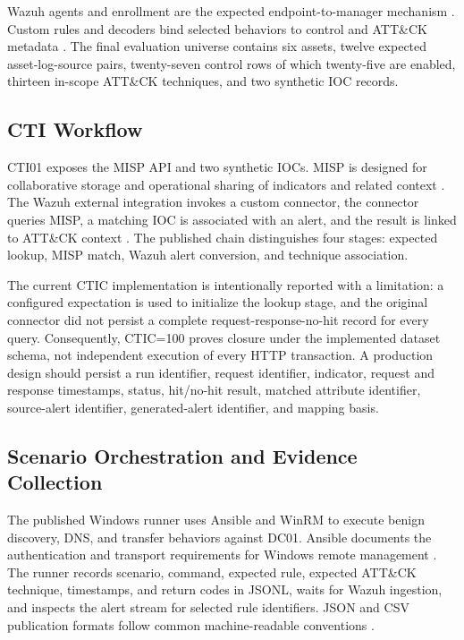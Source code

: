 \documentclass[a4paper,conference]{IEEEtran}
\begin{document}
Wazuh agents and enrollment are the expected endpoint-to-manager mechanism \cite{wazuh_agent_install,wazuh_enrollment}. Custom rules and decoders bind selected behaviors to control and ATT\&CK metadata \cite{wazuh_customrules,wazuh_mitre}. The final evaluation universe contains six assets, twelve expected asset-log-source pairs, twenty-seven control rows of which twenty-five are enabled, thirteen in-scope ATT\&CK techniques, and two synthetic IOC records.

\subsection{CTI Workflow}
CTI01 exposes the MISP API and two synthetic IOCs. MISP is designed for collaborative storage and operational sharing of indicators and related context \cite{wagner2016,misp_docs,misp_install}. The Wazuh external integration invokes a custom connector, the connector queries MISP, a matching IOC is associated with an alert, and the result is linked to ATT\&CK context \cite{wazuh_integrator,oasis_stix,oasis_taxii}. The published chain distinguishes four stages: expected lookup, MISP match, Wazuh alert conversion, and technique association.

The current CTIC implementation is intentionally reported with a limitation: a configured expectation is used to initialize the lookup stage, and the original connector did not persist a complete request-response-no-hit record for every query. Consequently, CTIC=100 proves closure under the implemented dataset schema, not independent execution of every HTTP transaction. A production design should persist a run identifier, request identifier, indicator, request and response timestamps, status, hit/no-hit result, matched attribute identifier, source-alert identifier, generated-alert identifier, and mapping basis.

\subsection{Scenario Orchestration and Evidence Collection}
The published Windows runner uses Ansible and WinRM to execute benign discovery, DNS, and transfer behaviors against DC01. Ansible documents the authentication and transport requirements for Windows remote management \cite{ansible_winrm}. The runner records scenario, command, expected rule, expected ATT\&CK technique, timestamps, and return codes in JSONL, waits for Wazuh ingestion, and inspects the alert stream for selected rule identifiers. JSON and CSV publication formats follow common machine-readable conventions \cite{rfc8259,rfc4180}.
\end{document}
